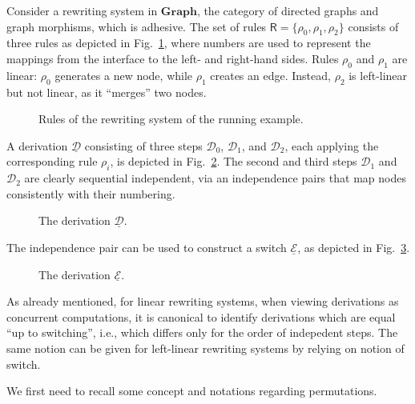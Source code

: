 \documentclass[a4paper,UKenglish,cleveref,pdftex,thm-restate,numberwithinsect,anonymous]{lipics}
\newcommand{\cat}[1]{\ensuremath{\mathbf{#1}}}
\def\R{\mathsf{R}}
\newcommand{\dder}[1]{\mathscr{#1}}
\newcommand{\der}[1]{\underline{\dder{#1}}}
\begin{document}
\begin{example}
  \label{ex:seq-ind}
  Consider a rewriting system in $\cat{Graph}$, the category of
  directed graphs and graph morphisms, which is adhesive. The set of
  rules $\R = \{ \rho_0, \rho_1, \rho_2\}$ consists of three rules as
  depicted in Fig.~\ref{fi:rules}, where numbers are used to represent
  the mappings from the interface to the left- and right-hand
  sides. Rules $\rho_0$ and $\rho_1$ are linear: $\rho_0$ generates a
  new node, while $\rho_1$ creates an edge. Instead, $\rho_2$ is
  left-linear but not linear, as it ``merges'' two nodes.


  \begin{figure}
    
    
    \caption{Rules of the rewriting system of the running example.}
    \label{fi:rules}
  \end{figure}
  
  A derivation $\der{D}$ consisting of three steps $\dder{D}_0$,
  $\dder{D}_1$, and $\dder{D}_2$, each applying the corresponding rule
  $\rho_i$, is depicted in Fig.~\ref{fi:derD}. The second and third
  steps $\dder{D}_1$ and $\dder{D}_2$ are clearly sequential
  independent, via an independence pairs that map nodes consistently
  with their numbering.
  
  \begin{figure}
    
    \caption{The derivation $\der{D}$.}
    \label{fi:derD}
  \end{figure}

  The independence pair can be used to construct a switch $\der{E}$, as
  depicted in Fig.~\ref{fi:derE}.
  \begin{figure}
    
    \caption{The derivation $\der{E}$.}
    \label{fi:derE}
  \end{figure}
\end{example}


As already mentioned, for linear rewriting systems, when viewing
derivations as concurrent computations, it is canonical to identify
derivations which are equal ``up to switching'', i.e., which differs
only for the order of indepedent steps. The same notion can be given
for left-linear rewriting systems by relying on notion of switch.


We first need to recall some concept and notations regarding permutations. 
\end{document}
